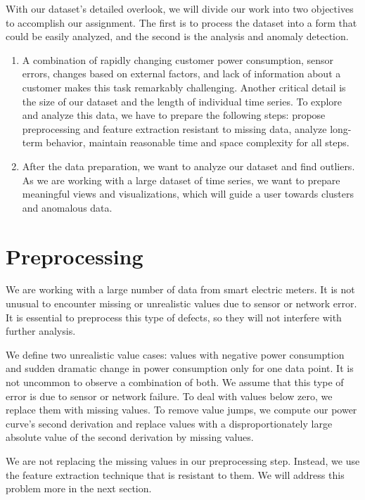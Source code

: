 With our dataset's detailed overlook, we will divide our work into two objectives to accomplish our assignment. The first is to process the dataset into a form that could be easily analyzed, and the second is the analysis and anomaly detection.

\begin{enumerate}
    \item A combination of rapidly changing customer power consumption, sensor errors, changes based on external factors, and lack of information about a customer makes this task remarkably challenging. Another critical detail is the size of our dataset and the length of individual time series. To explore and analyze this data, we have to prepare the following steps: propose preprocessing and feature extraction resistant to missing data, analyze long-term behavior, maintain reasonable time and space complexity for all steps.
    \item After the data preparation, we want to analyze our dataset and find outliers. As we are working with a large dataset of time series, we want to prepare meaningful views and visualizations, which will guide a user towards clusters and anomalous data.
\end{enumerate}


\section{Preprocessing}
We are working with a large number of data from smart electric meters. It is not unusual to encounter missing or unrealistic values due to sensor or network error. It is essential to preprocess this type of defects, so they will not interfere with further analysis.

We define two unrealistic value cases: values with negative power consumption and sudden dramatic change in power consumption only for one data point. It is not uncommon to observe a combination of both. We assume that this type of error is due to sensor or network failure. To deal with values below zero, we replace them with missing values. To remove value jumps, we compute our power curve's second derivation and replace values with a disproportionately large absolute value of the second derivation by missing values.

We are not replacing the missing values in our preprocessing step. Instead, we use the feature extraction technique that is resistant to them. We will address this problem more in the next section.

